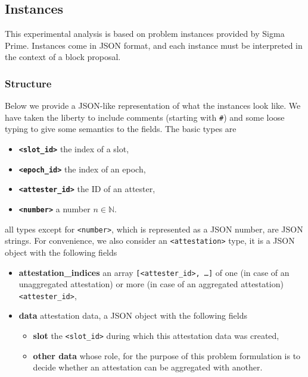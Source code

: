 \documentclass{article}
\begin{document}
\subsection{Instances}

This experimental analysis is based on problem instances provided by Sigma
Prime. Instances come in JSON format, and each instance must be interpreted in
the context of a block proposal.

\subsubsection{Structure}

Below we provide a JSON-like representation of what the instances look like.
We have taken the liberty to include comments (starting with \texttt{\#}) and
some loose typing to give some semantics to the fields. The basic types are 
%
\begin{itemize}
  \item \textbf{\texttt{<slot\_id>}} the index of a slot,
  \item \textbf{\texttt{<epoch\_id>}} the index of an epoch,
  \item \textbf{\texttt{<attester\_id>}} the ID of an attester,
  \item \textbf{\texttt{<number>}} a number $n \in \mathbb{N}$. 
\end{itemize}
%
all types except for \texttt{<number>}, which is represented as a JSON number,
are JSON strings. For convenience, we also consider an \texttt{<attestation>}
type, it is a JSON object with the following fields
\begin{itemize}
  \item \textbf{attestation\_indices} an array \texttt{[<attester\_id>, \dots]}
  of one (in case of an unaggregated attestation) or more (in case of an
  aggregated attestation) \texttt{<attester\_id>},
  \item \textbf{data} attestation data, a JSON object with the following fields
  \begin{itemize}
    \item \textbf{slot} the \texttt{<slot\_id>} during which this attestation
    data was created,
    \item \textbf{other data} whose role, for the purpose of this problem
    formulation is to decide whether an attestation can be aggregated with
    another.
  \end{itemize}
\end{itemize}
\end{document}
